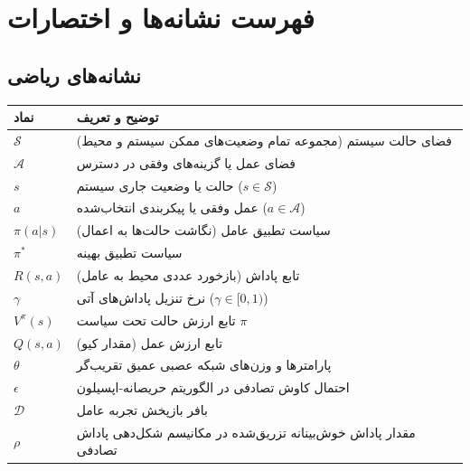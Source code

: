 \documentclass[oneside,openany,phd]{TMU-Thesis}
\begin{document}
\listoftables
\newpage

\listoffigures
\newpage

\chapter*{فهرست نشانه‌ها و اختصارات}

\section*{نشانه‌های ریاضی}
\noindent
\begin{tabular}{|p{2.5cm}|p{11.5cm}|}
\hline
\textbf{نماد} & \textbf{توضیح و تعریف} \\ \hline
$\mathcal{S}$ & فضای حالت سیستم (مجموعه تمام وضعیت‌های ممکن سیستم و محیط) \\ \hline
$\mathcal{A}$ & فضای عمل یا گزینه‌های وفقی در دسترس \\ \hline
$s$ & حالت یا وضعیت جاری سیستم ($s \in \mathcal{S}$) \\ \hline
$a$ & عمل وفقی یا پیکربندی انتخاب‌شده ($a \in \mathcal{A}$) \\ \hline
$\pi(a|s)$ & سیاست تطبیق عامل (نگاشت حالت‌ها به اعمال) \\ \hline
$\pi^*$ & سیاست تطبیق بهینه \\ \hline
$R(s, a)$ & تابع پاداش (بازخورد عددی محیط به عامل) \\ \hline
$\gamma$ & نرخ تنزیل پاداش‌های آتی ($\gamma \in [0, 1)$) \\ \hline
$V^\pi(s)$ & تابع ارزش حالت تحت سیاست $\pi$ \\ \hline
$Q(s, a)$ & تابع ارزش عمل (مقدار کیو) \\ \hline
$\theta$ & پارامترها و وزن‌های شبکه عصبی عمیق تقریب‌گر \\ \hline
$\epsilon$ & احتمال کاوش تصادفی در الگوریتم حریصانه-اپسیلون \\ \hline
$\mathcal{D}$ & بافر بازپخش تجربه عامل \\ \hline
$\rho$ & مقدار پاداش خوش‌بینانه تزریق‌شده در مکانیسم شکل‌دهی پاداش تصادفی \\ \hline
\end{tabular}

\newpage
\end{document}
